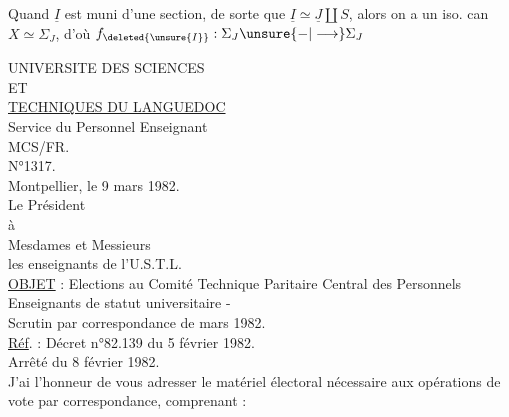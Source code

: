 
\hrulefill

Quand \(\underline I\) est muni d'une section, de sorte que \(\underline I\simeq\underline J\amalg S\), alors on a un iso. can \(X\simeq\Sigma_J\), d'où \(f_{\deleted{\unsure{I}}}:\Sigma_J\unsure{-|\longrightarrow}\Sigma_J\)

UNIVERSITE DES SCIENCES\\
ET\\
\uline{TECHNIQUES DU LANGUEDOC}\\
Service du Personnel Enseignant\\
MCS/FR.\\
N°1317.\\

Montpellier, le 9 mars 1982.\\

Le Président\\
à\\
Mesdames et Messieurs\\
les enseignants de l'U.S.T.L.\\

\uline{OBJET} : Elections au Comité Technique Paritaire Central des Personnels Enseignants de statut universitaire -\\
Scrutin par correspondance de mars 1982.\\

\uline{Réf}. : Décret n°82.139 du 5 février 1982.\\
Arrêté du 8 février 1982.\\

J'ai l'honneur de vous adresser le matériel électoral nécessaire aux opérations de vote par correspondance, comprenant :

